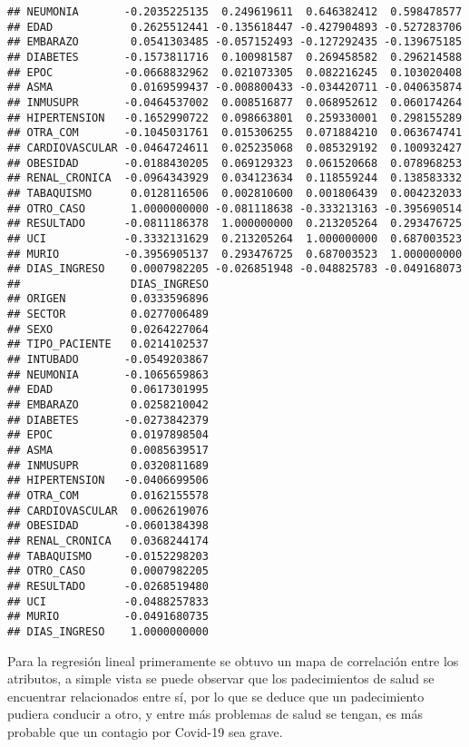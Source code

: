 \documentclass[]{article}
\begin{document}
\begin{verbatim}
## NEUMONIA       -0.2035225135  0.249619611  0.646382412  0.598478577
## EDAD            0.2625512441 -0.135618447 -0.427904893 -0.527283706
## EMBARAZO        0.0541303485 -0.057152493 -0.127292435 -0.139675185
## DIABETES       -0.1573811716  0.100981587  0.269458582  0.296214588
## EPOC           -0.0668832962  0.021073305  0.082216245  0.103020408
## ASMA            0.0169599437 -0.008800433 -0.034420711 -0.040635874
## INMUSUPR       -0.0464537002  0.008516877  0.068952612  0.060174264
## HIPERTENSION   -0.1652990722  0.098663801  0.259330001  0.298155289
## OTRA_COM       -0.1045031761  0.015306255  0.071884210  0.063674741
## CARDIOVASCULAR -0.0464724611  0.025235068  0.085329192  0.100932427
## OBESIDAD       -0.0188430205  0.069129323  0.061520668  0.078968253
## RENAL_CRONICA  -0.0964343929  0.034123634  0.118559244  0.138583332
## TABAQUISMO      0.0128116506  0.002810600  0.001806439  0.004232033
## OTRO_CASO       1.0000000000 -0.081118638 -0.333213163 -0.395690514
## RESULTADO      -0.0811186378  1.000000000  0.213205264  0.293476725
## UCI            -0.3332131629  0.213205264  1.000000000  0.687003523
## MURIO          -0.3956905137  0.293476725  0.687003523  1.000000000
## DIAS_INGRESO    0.0007982205 -0.026851948 -0.048825783 -0.049168073
##                 DIAS_INGRESO
## ORIGEN          0.0333596896
## SECTOR          0.0277006489
## SEXO            0.0264227064
## TIPO_PACIENTE   0.0214102537
## INTUBADO       -0.0549203867
## NEUMONIA       -0.1065659863
## EDAD            0.0617301995
## EMBARAZO        0.0258210042
## DIABETES       -0.0273842379
## EPOC            0.0197898504
## ASMA            0.0085639517
## INMUSUPR        0.0320811689
## HIPERTENSION   -0.0406699506
## OTRA_COM        0.0162155578
## CARDIOVASCULAR  0.0062619076
## OBESIDAD       -0.0601384398
## RENAL_CRONICA   0.0368244174
## TABAQUISMO     -0.0152298203
## OTRO_CASO       0.0007982205
## RESULTADO      -0.0268519480
## UCI            -0.0488257833
## MURIO          -0.0491680735
## DIAS_INGRESO    1.0000000000
\end{verbatim}

Para la regresión lineal primeramente se obtuvo un mapa de correlación
entre los atributos, a simple vista se puede observar que los
padecimientos de salud se encuentrar relacionados entre sí, por lo que
se deduce que un padecimiento pudiera conducir a otro, y entre más
problemas de salud se tengan, es más probable que un contagio por
Covid-19 sea grave.
\end{document}
